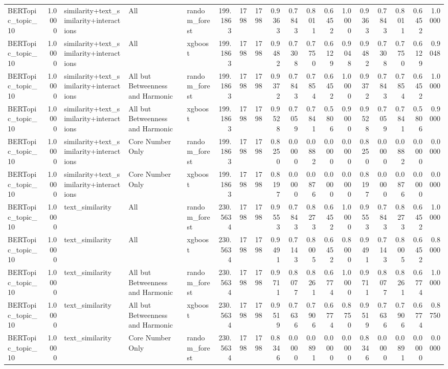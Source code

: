 \begin{tabular}{lrlllrrrrrrrrrrrrr}
BERTopic_topic_10 & 1.0000 & similarity+text_similarity+interactions & All & random_forest & 199.1863 & 1798 & 1798 & 0.9363 & 0.7843 & 0.8011 & 0.6452 & 1.0000 & 0.9363 & 0.7843 & 0.8011 & 0.6452 & 1.0000 \\
BERTopic_topic_10 & 1.0000 & similarity+text_similarity+interactions & All & xgboost & 199.1863 & 1798 & 1798 & 0.9482 & 0.7308 & 0.7750 & 0.6129 & 0.9048 & 0.9482 & 0.7308 & 0.7750 & 0.6129 & 0.9048 \\
BERTopic_topic_10 & 1.0000 & similarity+text_similarity+interactions & All but Betweenness and Harmonic & random_forest & 199.1863 & 1798 & 1798 & 0.9372 & 0.7843 & 0.7854 & 0.6452 & 1.0000 & 0.9372 & 0.7843 & 0.7854 & 0.6452 & 1.0000 \\
BERTopic_topic_10 & 1.0000 & similarity+text_similarity+interactions & All but Betweenness and Harmonic & xgboost & 199.1863 & 1798 & 1798 & 0.9528 & 0.7059 & 0.7841 & 0.5806 & 0.9000 & 0.9528 & 0.7059 & 0.7841 & 0.5806 & 0.9000 \\
BERTopic_topic_10 & 1.0000 & similarity+text_similarity+interactions & Core Number Only & random_forest & 199.1863 & 1798 & 1798 & 0.8250 & 0.0000 & 0.0882 & 0.0000 & 0.0000 & 0.8250 & 0.0000 & 0.0882 & 0.0000 & 0.0000 \\
BERTopic_topic_10 & 1.0000 & similarity+text_similarity+interactions & Core Number Only & xgboost & 199.1863 & 1798 & 1798 & 0.8197 & 0.0000 & 0.0876 & 0.0000 & 0.0000 & 0.8197 & 0.0000 & 0.0876 & 0.0000 & 0.0000 \\
BERTopic_topic_10 & 1.0000 & text_similarity & All & random_forest & 230.5634 & 1798 & 1798 & 0.9553 & 0.7843 & 0.8273 & 0.6452 & 1.0000 & 0.9553 & 0.7843 & 0.8273 & 0.6452 & 1.0000 \\
BERTopic_topic_10 & 1.0000 & text_similarity & All & xgboost & 230.5634 & 1798 & 1798 & 0.9491 & 0.7143 & 0.8005 & 0.6452 & 0.8000 & 0.9491 & 0.7143 & 0.8005 & 0.6452 & 0.8000 \\
BERTopic_topic_10 & 1.0000 & text_similarity & All but Betweenness and Harmonic & random_forest & 230.5634 & 1798 & 1798 & 0.9711 & 0.8077 & 0.8261 & 0.6774 & 1.0000 & 0.9711 & 0.8077 & 0.8261 & 0.6774 & 1.0000 \\
BERTopic_topic_10 & 1.0000 & text_similarity & All but Betweenness and Harmonic & xgboost & 230.5634 & 1798 & 1798 & 0.9519 & 0.7636 & 0.7906 & 0.6774 & 0.8750 & 0.9519 & 0.7636 & 0.7906 & 0.6774 & 0.8750 \\
BERTopic_topic_10 & 1.0000 & text_similarity & Core Number Only & random_forest & 230.5634 & 1798 & 1798 & 0.8346 & 0.0000 & 0.0891 & 0.0000 & 0.0000 & 0.8346 & 0.0000 & 0.0891 & 0.0000 & 0.0000 \\

\end{tabular}
